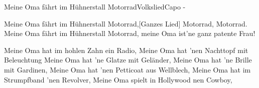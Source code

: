 \begin{song}{Meine Oma fährt im Hühnerstall Motorrad}{Volkslied}{Capo -}

Meine Oma fährt im Hühnerstall Motorrad,[Ganzes Lied]
Motorrad, Motorrad.
Meine Oma fährt im Hühnerstall Motorrad,
meine Oma ist'ne ganz patente Frau!

Meine Oma hat im hohlen Zahn ein Radio,
Meine Oma hat 'nen Nachttopf mit Beleuchtung
Meine Oma hat 'ne Glatze mit Geländer,
Meine Oma hat 'ne Brille mit Gardinen,
Meine Oma hat 'nen Petticoat aus Wellblech,
Meine Oma hat im Strumpfband 'nen Revolver,
Meine Oma spielt in Hollywood nen Cowboy,
\end{song}